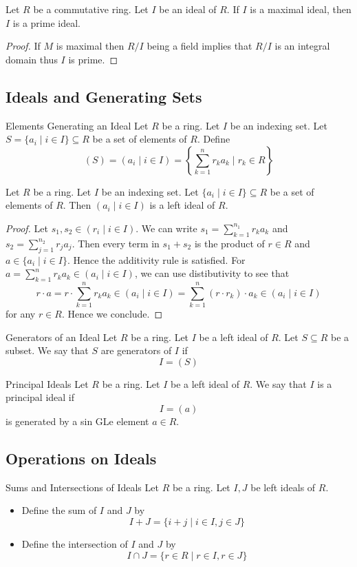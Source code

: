 \documentclass[a4paper]{article}
\begin{document}
\begin{crl}{}{} Let $R$ be a commutative ring. Let $I$ be an ideal of $R$. If $I$ is a maximal ideal, then $I$ is a prime ideal. 
\begin{proof}
If $M$ is maximal then $R/I$ being a field implies that $R/I$ is an integral domain thus $I$ is prime. 
\end{proof}
\end{crl}

\subsection{Ideals and Generating Sets}
\begin{defn}{Elements Generating an Ideal}{} Let $R$ be a ring. Let $I$ be an indexing set. Let $S=\{a_i\;|\;i\in I\}\subseteq R$ be a set of elements of $R$. Define $$(S)=(a_i\;|\;i\in I)=\left\{\sum_{k=1}^nr_ka_k\;|\;r_k\in R\right\}$$
\end{defn}

\begin{lmm}{}{} Let $R$ be a ring. Let $I$ be an indexing set. Let $\{a_i\;|\;i\in I\}\subseteq R$ be a set of elements of $R$. Then $(a_i\;|\;i\in I)$ is a left ideal of $R$. 
\begin{proof}
Let $s_1,s_2\in(r_i\;|\;i\in I)$. We can write $s_1=\sum_{k=1}^{n_1}r_ka_k$ and $s_2=\sum_{j=1}^{n_2}r_ja_j$. Then every term in $s_1+s_2$ is the product of $r\in R$ and $a\in\{a_i\;|\;i\in I\}$. Hence the additivity rule is satisfied. For $a=\sum_{k=1}^nr_ka_k\in(a_i\;|\;i\in I)$, we can use distibutivity to see that $$r\cdot a=r\cdot\sum_{k=1}^nr_ka_k\in(a_i\;|\;i\in I)=\sum_{k=1}^n(r\cdot r_k)\cdot a_k\in(a_i\;|\;i\in I)$$ for any $r\in R$. Hence we conclude. 
\end{proof}
\end{lmm}

\begin{defn}{Generators of an Ideal}{} Let $R$ be a ring. Let $I$ be a left ideal of $R$. Let $S\subseteq R$ be a subset. We say that $S$ are generators of $I$ if $$I=(S)$$
\end{defn}

\begin{defn}{Principal Ideals}{} Let $R$ be a ring. Let $I$ be a left ideal of $R$. We say that $I$ is a principal ideal if $$I=(a)$$ is generated by a sin GLe element $a\in R$. 
\end{defn}

\subsection{Operations on Ideals}
\begin{defn}{Sums and Intersections of Ideals}{} Let $R$ be a ring. Let $I,J$ be left ideals of $R$. 
\begin{itemize}
\item Define the sum of $I$ and $J$ by $$I+J=\{i+j\;|\;i\in I,j\in J\}$$
\item Define the intersection of $I$ and $J$ by $$I\cap J=\{r\in R\;|\;r\in I,r\in J\}$$
\end{itemize}
\end{defn}
\end{document}
